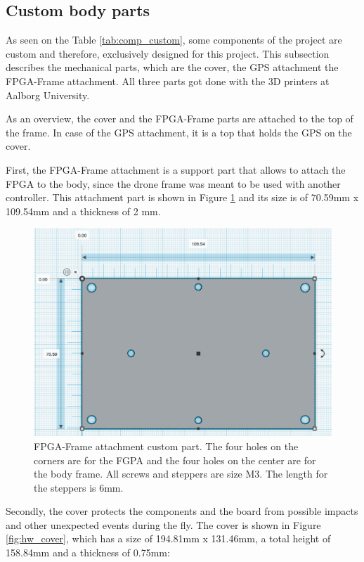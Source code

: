\subsection{Custom body parts}

As seen on the Table \ref{tab:comp_custom}, some components of the project are custom and therefore, exclusively designed for this project. This subsection describes the mechanical parts, which are the cover, the GPS attachment the FPGA-Frame attachment. All three parts got done with the 3D printers at Aalborg University.

As an overview, the cover and the FPGA-Frame parts are attached to the top of the frame. In case of the GPS attachment, it is a top that holds the GPS on the cover. 


First, the FPGA-Frame attachment is a support part that allows to attach the FPGA to the body, since the drone frame was meant to be used with another controller. This attachment part is shown in Figure \ref{fig:hw_fpgaBase}  and its size is of 70.59mm x 109.54mm and a thickness of 2 mm.

\begin{figure}[!htb]
    \centering
    \includegraphics[width=\textwidth]{Figures/hardware/fpga_attachment.png}
    \caption{FPGA-Frame attachment custom part. The four holes on the corners are for the FGPA and the four holes on the center are for the body frame. All screws and steppers are size M3. The length for the steppers is 6mm.}
    \label{fig:hw_fpgaBase}
\end{figure}


Secondly, the cover protects the components and the board from possible impacts and other unexpected events during the fly. The cover is shown in Figure \ref{fig:hw_cover}, which has a size of 194.81mm x 131.46mm, a total height of 158.84mm and a thickness of 0.75mm:

